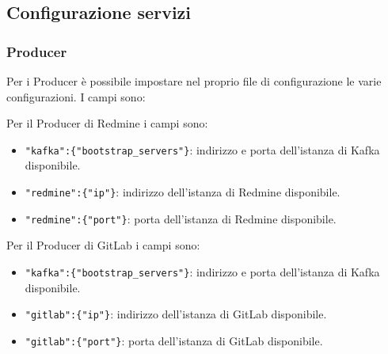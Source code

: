 \subsection{Configurazione servizi \progetto}\label{var}

	\subsubsection{Producer}
	Per i Producer è possibile impostare nel proprio file di configurazione le varie configurazioni. I campi sono:

	Per il Producer di Redmine i campi sono:
	\begin{itemize}
		\item\texttt{"kafka":\{"bootstrap\_servers"\}}: indirizzo e porta dell'istanza di Kafka disponibile.
		\item\texttt{"redmine":\{"ip"\}}: indirizzo dell'istanza di Redmine disponibile.
		\item\texttt{"redmine":\{"port"\}}: porta dell'istanza di Redmine disponibile.
	\end{itemize}

	Per il Producer di GitLab i campi sono:
	\begin{itemize}
		\item\texttt{"kafka":\{"bootstrap\_servers"\}}: indirizzo e porta dell'istanza di Kafka disponibile.
		\item\texttt{"gitlab":\{"ip"\}}: indirizzo dell'istanza di GitLab disponibile.
		\item\texttt{"gitlab":\{"port"\}}: porta dell'istanza di GitLab disponibile.
	\end{itemize}

